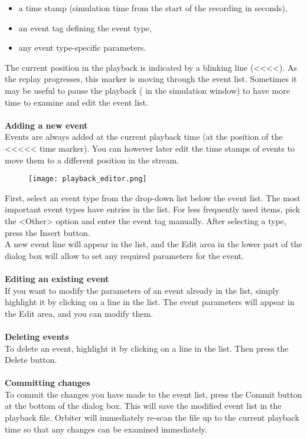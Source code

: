 \documentclass[Orbiter User Manual.tex]{subfiles}
\begin{document}
\begin{itemize}
\item a time stamp (simulation time from the start of the recording in seconds),
\item an event tag defining the event type,
\item any event type-specific parameters.
\end{itemize}

\noindent
The current position in the playback is indicated by a blinking line (<{}<{}<{}<). As the replay progresses, this marker is moving through the event list. Sometimes it may be useful to pause the playback (\Ctrl{} in the simulation window) to have more time to examine and edit the event list.\\
\\
\textbf{Adding a new event}\\
Events are always added at the current playback time (at the position of the <{}<{}<{}<{}< time marker). You can however later edit the time stamps of events to move them to a different position in the stream.

\begin{figure}[H]
	\centering
	\texttt{[image: playback\_editor.png]}
\end{figure}

\noindent
First, select an event type from the drop-down list below the event list. The most important event types have entries in the list. For less frequently used items, pick the <Other> option and enter the event tag manually. After selecting a type, press the Insert button.\\
A new event line will appear in the list, and the Edit area in the lower part of the dialog box will allow to set any required parameters for the event.\\
\\
\textbf{Editing an existing event}\\
If you want to modify the parameters of an event already in the list, simply highlight it by clicking on a line in the list. The event parameters will appear in the Edit area, and you can modify them.\\
\\
\textbf{Deleting events}\\
To delete an event, highlight it by clicking on a line in the list. Then press the Delete button.\\
\\
\textbf{Committing changes}\\
To commit the changes you have made to the event list, press the Commit button at the bottom of the dialog box. This will save the modified event list in the playback file. Orbiter will immediately re-scan the file up to the current playback time so that any changes can be examined immediately.
\end{document}
